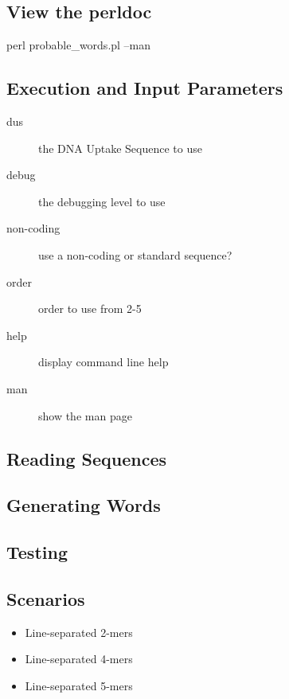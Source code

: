 \documentclass[12pt,notitlepage]{article}
\begin{document}
\begin{s5presentation}
\begin{ifhtml}
\begin{s5slide}
      \subsection{View the perldoc}
      perl probable_words.pl --man
    \end{s5slide}

    \begin{s5slide}
      \section{Execution and Input Parameters}
     
      \begin{description}
        \item[dus] the DNA Uptake Sequence to use
        \item[debug] the debugging level to use
        \item[non-coding] use a non-coding or standard sequence?
        \item[order] order to use from 2-5
        \item[help] display command line help
        \item[man] show the man page
      \end{description}
    \end{s5slide}

    \begin{s5slide}
      \section{Reading Sequences}
    \end{s5slide}

    \begin{s5slide}
      \section{Generating Words}
    \end{s5slide}

    \begin{s5slide}
      \section{Testing}
      \subsection{Scenarios}
      \begin{itemize}
      \item Line-separated 2-mers
      \item Line-separated 4-mers
      \item Line-separated 5-mers
      \end{itemize}
    \end{s5slide}


\end{ifhtml}
\end{s5presentation}
\end{document}
